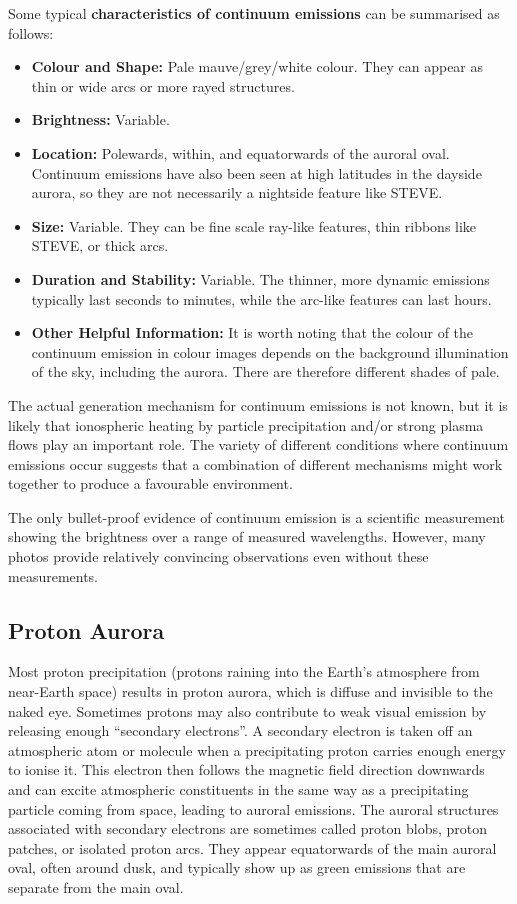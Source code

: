 \documentclass{article}
\newcommand{\contributed}[1]{%
    \par\noindent
    \begingroup
    \setlength{\leftskip}{1em}%
    \itshape
    Contributors: #1
    \par
    \endgroup
    \vspace{0.5em}
}
\begin{document}
Some typical {\bf characteristics of continuum emissions} can be summarised as follows:
\begin{itemize}
    \item \textbf{Colour and Shape:} Pale mauve/grey/white colour. They can appear as thin or wide arcs or more rayed structures.
    \item \textbf{Brightness:} Variable.
    \item \textbf{Location:} Polewards, within, and equatorwards of the auroral oval. Continuum emissions have also been seen at high latitudes in the dayside aurora, so they are not necessarily a nightside feature like STEVE.
    \item \textbf{Size:} Variable. They can be fine scale ray-like features, thin ribbons like STEVE, or thick arcs.
    \item \textbf{Duration and Stability:} Variable. The thinner, more dynamic emissions typically last seconds to minutes, while the arc-like features can last hours.
    \item \textbf{Other Helpful Information:} It is worth noting that the colour of the continuum emission in colour images depends on the background illumination of the sky, including the aurora. There are therefore different shades of pale.
    \end{itemize}


The actual generation mechanism for continuum emissions is not known, but it is likely that ionospheric heating by particle precipitation and/or strong plasma flows play an important role. The variety of different conditions where continuum emissions occur suggests that a combination of different mechanisms might work together to produce a favourable environment.

The only bullet-proof evidence of continuum emission is a scientific measurement showing the brightness over a range of measured wavelengths. However, many photos provide relatively convincing observations even without these measurements. 


\subsection{Proton Aurora}\label{proton-aurora}

Most proton precipitation (protons raining into the Earth's atmosphere from near-Earth space) results in proton aurora, which is diffuse and invisible to the naked eye. Sometimes protons may also contribute to weak visual emission by releasing enough ``secondary electrons''. A secondary electron is taken off an atmospheric atom or molecule when a precipitating proton carries enough energy to ionise it. This electron then follows the magnetic field direction downwards and can excite atmospheric constituents in the same way as a precipitating particle coming from space, leading to auroral emissions. The auroral structures associated with secondary electrons are sometimes called proton blobs, proton patches, or isolated proton arcs. They  appear equatorwards of the main auroral oval, often around dusk, and typically show up as green emissions that are separate from the main oval.
\end{document}
